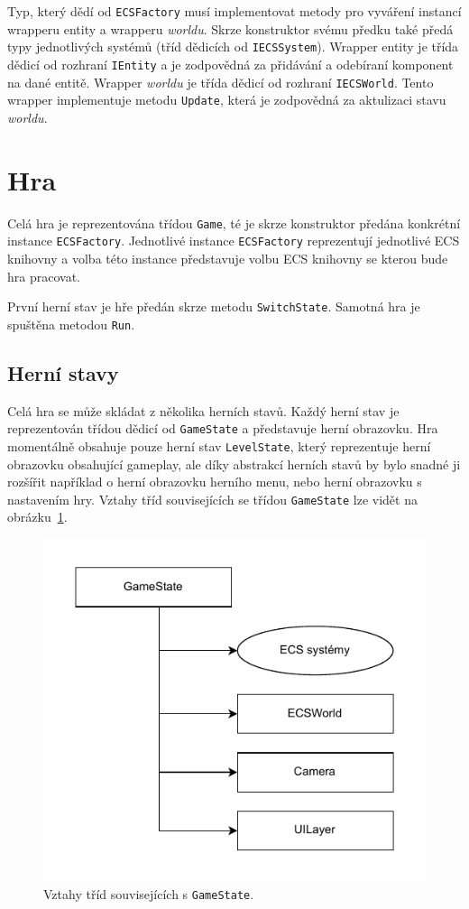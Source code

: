 Typ, který dědí od \texttt{ECSFactory} musí implementovat metody pro vyváření instancí wrapperu entity a wrapperu \textit{worldu}. Skrze konstruktor svému předku také předá typy jednotlivých systémů (tříd dědicích od \texttt{IECSSystem}). Wrapper entity je třída dědicí od rozhraní \texttt{IEntity} a je zodpovědná za přidávání a odebíraní komponent na dané entitě. Wrapper \textit{worldu} je třída dědicí od rozhraní \texttt{IECSWorld}. Tento wrapper implementuje metodu \texttt{Update}, která je zodpovědná za aktulizaci stavu \textit{worldu}.

\section{Hra}
\label{sec:game-impl}
Celá hra je reprezentována třídou \texttt{Game}, té je skrze konstruktor předána konkrétní instance \texttt{ECSFactory}. Jednotlivé instance \texttt{ECSFactory} reprezentují jednotlivé ECS knihovny a volba této instance představuje volbu ECS knihovny se kterou bude hra pracovat.

První herní stav je hře předán skrze metodu \texttt{SwitchState}. Samotná hra je spuštěna metodou \texttt{Run}.

\subsection{Herní stavy}
Celá hra se může skládat z několika herních stavů. Každý herní stav je reprezentován třídou dědicí od \texttt{GameState} a představuje herní obrazovku. Hra momentálně obsahuje pouze herní stav \texttt{LevelState}, který reprezentuje herní obrazovku obsahující gameplay, ale díky abstrakcí herních stavů by bylo snadné ji rozšířit například o herní obrazovku herního menu, nebo herní obrazovku s nastavením hry. Vztahy tříd souvisejících se třídou \texttt{GameState} lze vidět na obrázku~\ref{fig:game-state}.

\begin{figure}[!htb]
  \centering
  \includegraphics[width=0.5\linewidth]{img/game-state.pdf}
  \caption{Vztahy tříd souvisejících s \texttt{GameState}.}
  \label{fig:game-state}
\end{figure}

